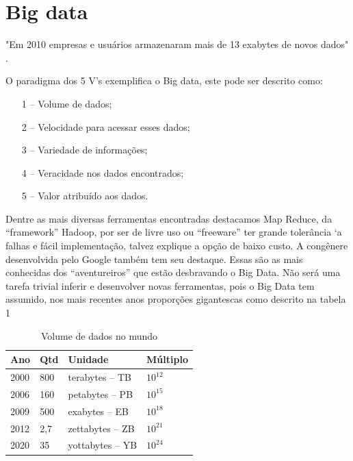 \documentclass[conference,compsoc]{IEEEtran}
\begin{document}
\section{Big data}

"Em 2010 empresas e usuários armazenaram mais de 13 exabytes de novos dados" \cite{bigdataQualquerUm}.

O paradigma dos 5 V’s exemplifica o Big data, este pode ser descrito como: 

\begin{enumerate}
	\item[1 --]Volume de dados;
	\item[2 --]Velocidade para acessar esses dados;
	\item[3 --]Variedade de informações;
	\item[4 --]Veracidade nos dados encontrados;
	\item[5 --]Valor atribuído aos dados.
\end{enumerate}
  
Dentre as mais diversas ferramentas encontradas destacamos Map Reduce, da ``framework'' Hadoop, por ser de livre uso ou ``freeware'' ter grande tolerância `a falhas e fácil implementação, talvez explique a opção de baixo custo.
A congênere desenvolvida pelo Google também tem seu destaque. Essas são as mais conhecidas dos ``aventureiros'' que estão desbravando o Big Data. Não será uma tarefa trivial inferir e desenvolver novas ferramentas, pois o Big Data tem 
assumido, nos mais recentes anos proporções gigantescas como descrito na tabela 1




\begin{table}[!ht]
\scriptsize
\centering
\caption{Volume de dados no mundo}
\begin{tabular}{|p{6mm}|p{5mm}|p{16mm}|p{8mm}|}
\hline
Ano & Qtd & Unidade & Múltiplo \\
\hline
2000 & 800 & terabytes – TB & $10^{12}$ \\ \hline

2006 & 160 & petabytes – PB & $10^{15}$ \\ \hline

2009 & 500 & exabytes – EB & $10^{18}$ \\ \hline

2012 & 2,7 & zettabytes – ZB & $10^{21}$ \\ \hline

2020 & 35 & yottabytes – YB & $10^{24}$ \\ \hline

\end{tabular}
\end{table}
\end{document}
